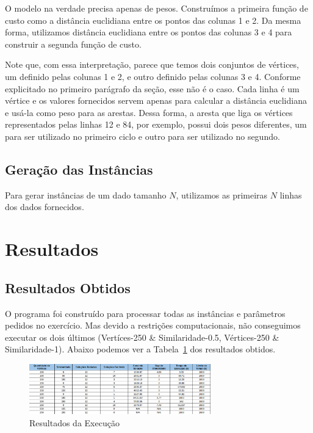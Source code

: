 \documentclass{article}
\begin{document}
O modelo na verdade precisa apenas de pesos. Construímos a primeira função de custo como a distância euclidiana entre os pontos das colunas 1 e 2. Da mesma forma, utilizamos distância euclidiana entre os pontos das colunas 3 e 4 para construir a segunda função de custo.

Note que, com essa interpretação, parece que temos dois conjuntos de vértices, um definido pelas colunas 1 e 2, e outro definido pelas colunas 3 e 4. Conforme explicitado no primeiro parágrafo da seção, esse não é o caso. Cada linha é um vértice e os valores fornecidos servem apenas para calcular a distância euclidiana e usá-la como peso para as arestas. Dessa forma, a aresta que liga os vértices representados pelas linhas 12 e 84, por exemplo, possui dois pesos diferentes, um para ser utilizado no primeiro ciclo e outro para ser utilizado no segundo.

\subsection{Geração das Instâncias}

Para gerar instâncias de um dado tamanho $N$, utilizamos as primeiras $N$ linhas dos dados fornecidos.

\section{Resultados}

\subsection{Resultados Obtidos}

O programa foi construído para processar todas as instâncias e parâmetros pedidos no exercício. Mas devido a restrições computacionais, não conseguimos executar os dois últimos (Vertíces-250 \& Similaridade-0.5, Vértices-250 \& Similaridade-1). Abaixo podemos ver a Tabela~\ref{f:dados}  dos resultados obtidos.
\begin{figure}
    \centering
    \includegraphics[width=0.7\textwidth]{figures/resultados.png}
    \caption{Resultados da Execução}
    \label{f:dados}
\end{figure}
\end{document}
